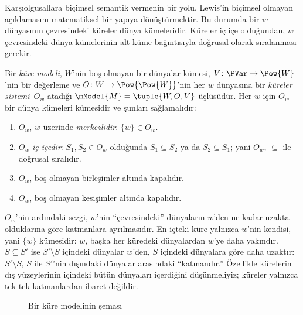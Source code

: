 



Karşıolgusallara biçimsel semantik vermenin bir yolu, Lewis'in biçimsel
olmayan açıklamasını matematiksel bir yapıya dönüştürmektir. Bu durumda bir
$w$ dünyasının çevresindeki küreler dünya kümeleridir. Küreler iç içe
olduğundan, $w$ çevresindeki dünya kümelerinin alt küme bağıntısıyla doğrusal
olarak sıralanması gerekir.

\begin{defn}
  Bir \emph{küre modeli}, $W$'nin boş olmayan bir dünyalar kümesi,
  $V\colon\PVar\to\Pow{W}$'nin bir değerleme ve
  $O\colon W\to\Pow{\Pow{W}}$'nin her $w$ dünyasına bir
  \emph{küreler sistemi}~$O_w$ atadığı $\mModel{M}=\tuple{W,O,V}$
  üçlüsüdür. Her $w$ için $O_w$ bir dünya kümeleri kümesidir ve şunları
  sağlamalıdır:
  \begin{enumerate}
  \item $O_w$, $w$ üzerinde \emph{merkezlidir}: $\{w\}\in O_w$.
  \item $O_w$ \emph{iç içedir}: $S_1,S_2\in O_w$ olduğunda
    $S_1\subseteq S_2$ ya da $S_2\subseteq S_1$; yani $O_w$,
    $\subseteq$ ile doğrusal sıralıdır.
  \item $O_w$, boş olmayan birleşimler altında kapalıdır.
  \item $O_w$, boş olmayan kesişimler altında kapalıdır.
  \end{enumerate}
\end{defn}

$O_w$'nin ardındaki sezgi, $w$'nin ``çevresindeki'' dünyaların $w$'den ne
kadar uzakta olduklarına göre katmanlara ayrılmasıdır. En içteki küre yalnızca
$w$'nin kendisi, yani $\{w\}$ kümesidir: $w$, başka her küredeki dünyalardan
$w$'ye daha yakındır. $S\subsetneq S'$ ise $S'\setminus S$ içindeki dünyalar
$w$'den, $S$ içindeki dünyalara göre daha uzaktır: $S'\setminus S$, $S$ ile
$S'$'nin dışındaki dünyalar arasındaki ``katmandır.'' Özellikle kürelerin dış
yüzeylerinin içindeki bütün dünyaları içerdiğini düşünmeliyiz; küreler yalnızca
tek tek katmanlardan ibaret değildir.

\begin{figure}
\begin{center}
\caption{Bir küre modelinin şeması}
\end{center}
\end{figure}

